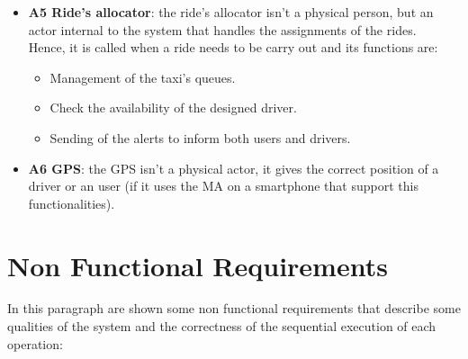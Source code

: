 \begin{itemize}
	\item \textbf{A5 Ride's allocator}:	the ride's allocator isn't a physical person, but an actor internal to the system that handles the assignments of the rides.\\
Hence, it is called when a ride needs to be carry out and its functions are:
	\begin{itemize}
		\item Management of the taxi's queues.
		\item Check the availability of the designed driver.
		\item Sending of the alerts to inform both users and drivers.
	\end{itemize}

	\item \textbf{A6 GPS}: the GPS isn't a physical actor, it gives the correct position of a driver or an user (if it uses the MA on a smartphone that support this functionalities).
	
\end{itemize}

\section{Non Functional Requirements}
In this paragraph are shown some non functional requirements that describe some qualities of the system and the correctness of the sequential execution of each operation:

